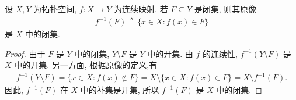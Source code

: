\documentclass[../../main.tex]{subfiles}%
\begin{document}
\begin{proposition}[连续映射下闭集的原像是闭集]\label{proposition:连续映射下闭集的原像是闭集}
设 $X,Y$ 为拓扑空间, $f:X\to Y$ 为连续映射.
若 $F\subseteq Y$ 是闭集, 则其原像
\begin{align*}
f^{-1}(F)\triangleq\{x\in X:f(x)\in F\}
\end{align*}
是 $X$ 中的闭集.
\end{proposition}
\begin{proof}
由于 $F$ 是 $Y$ 中的闭集, $Y\setminus F$ 是 $Y$ 中的开集.
由 $f$ 的连续性, $f^{-1}(Y\setminus F)$ 是 $X$ 中的开集.
另一方面, 根据原像的定义,有
\begin{align*}
f^{-1}(Y\setminus F)
=\{x\in X:f(x)\notin F\}=X\setminus\{x\in X:f(x)\in F\}=X\setminus f^{-1}(F).
\end{align*}
因此, $f^{-1}(F)$ 在 $X$ 中的补集是开集, 所以 $f^{-1}(F)$ 是 $X$ 中的闭集.
\end{proof}
\end{document}
